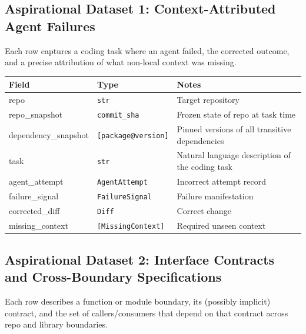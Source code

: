 \documentclass[a4paper,12pt]{article}
\begin{document}
\subsection*{Aspirational Dataset 1: Context-Attributed Agent Failures}

\noindent Each row captures a coding task where an agent failed, the corrected outcome, and a precise attribution of what non-local context was missing. 

\begin{tcolorbox}[title=Task]
\footnotesize
\begin{tabularx}{\linewidth}{@{} l l Y @{}}
\toprule
\textbf{Field} & \textbf{Type} & \textbf{Notes} \\
\midrule
repo & \texttt{str} & Target repository \\
repo\_snapshot & \texttt{commit\_sha} & Frozen state of repo at task time \\
dependency\_snapshot & \texttt{[package@version]} & Pinned versions of all transitive dependencies \\
task & \texttt{str} & Natural language description of the coding task \\
agent\_attempt & \texttt{AgentAttempt} & Incorrect attempt record \\
failure\_signal & \texttt{FailureSignal} & Failure manifestation \\
corrected\_diff & \texttt{Diff} & Correct change \\
missing\_context & \texttt{[MissingContext]} & Required unseen context \\
\bottomrule
\end{tabularx}
\end{tcolorbox}

\subsection*{Aspirational Dataset 2: Interface Contracts and Cross-Boundary Specifications}

\noindent Each row describes a function or module boundary, its (possibly implicit) contract, and the set of callers/consumers that depend on that contract across repo and library boundaries.
\end{document}
